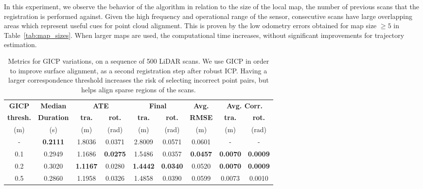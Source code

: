 In this experiment, we observe the behavior of the algorithm in relation to the size of the local map, \ie the number of previous scans that the registration is performed against. Given the high frequency and operational range of the sensor, consecutive scans have large overlapping areas which represent useful cues for point cloud alignment. This is proven by the low odometry errors obtained for map size $\geq 5$ in Table~\ref{tab:map_sizes}. When larger maps are used, the computational time increases, without significant improvements for trajectory estimation.



\begin{table}[h]
    \centering
    {\small
        \begin{tabular}{c|c|cc|cc|c|cc}
            \hline
            \textbf{GICP}    & \textbf{Median}   & \multicolumn{2}{c|}{ \textbf{ATE}} & \multicolumn{2}{c|}{ \textbf{Final}} & \textbf{Avg.}   & \multicolumn{2}{c}{ \textbf{Avg. Corr.}}                                                       \\
            \textbf{thresh.} & \textbf{Duration} & \textbf{tra.}                      & \textbf{rot.}                        & \textbf{tra.}   & \textbf{rot.}                            & \textbf{RMSE}   & \textbf{tra.}   & \textbf{rot.}   \\
            (m)              & (s)               & (m)                                & (rad)                                & (m)             & (rad)                                    & (m)             & (m)             & (rad)           \\
            \hline
            \hline
            -                & \textbf{0.2111}   & 1.8036                             & 0.0371                               & 2.8009          & 0.0571                                   & 0.0601          & -               & -               \\
            0.1              & 0.2949            & 1.1686                             & \textbf{0.0275}                      & 1.5486          & 0.0357                                   & \textbf{0.0457} & \textbf{0.0070} & \textbf{0.0009} \\
            0.2              & 0.3020            & \textbf{1.1167}                    & 0.0280                               & \textbf{1.4442} & \textbf{0.0340}                          & 0.0520          & \textbf{0.0070} & \textbf{0.0009} \\
            0.5              & 0.2860            & 1.1958                             & 0.0326                               & 1.4858          & 0.0390                                   & 0.0599          & 0.0073          & 0.0010          \\
            \hline
        \end{tabular}
    }
    \caption{Metrics for GICP variations, on a sequence of 500 LiDAR scans. We use GICP in order to improve surface alignment, as a second registration step after robust ICP. Having a larger correspondence threshold increases the risk of selecting incorrect point pairs, but helps align sparse regions of the scans.}
    \label{tab:gicp_variations}
\end{table}
